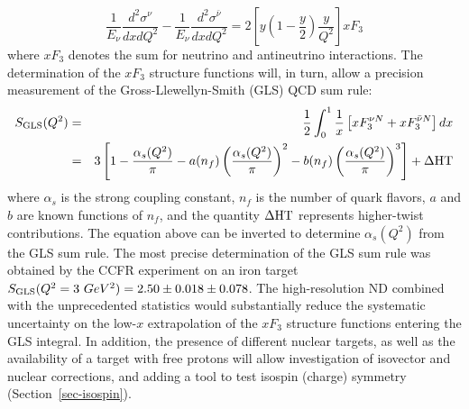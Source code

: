 \begin{equation} 
\frac{1}{E_\nu} \frac{d^2 \sigma^\nu}{dx dQ^2} - \frac{1}{E_\nu} \frac{d^2 \sigma^{\bar \nu}}{dx dQ^2} = 2 \left[ y \left( 1 - \frac{y}{2} \right) \frac{y}{Q^2} \right] xF_3  
\end{equation} where $xF_3$ denotes the sum for neutrino and antineutrino interactions. 
The determination of the $xF_3$ structure functions will, in turn,
allow a precision measurement of the Gross-Llewellyn-Smith (GLS) QCD
sum rule:
\begin{eqnarray}
\label{eq:GLS}
S_{\rm GLS} (Q^2) & = & 
\frac{1}{2} \int^1_0 \frac{1}{x} \left[ xF_3^{\nu N} + xF_3^{\bar \nu N} \right] dx \nonumber \\ 
& = & 3 \left[ 1 - \frac{\alpha_s(Q^2)}{\pi} - a(n_f) \left( \frac{\alpha_s(Q^2)}{\pi} \right)^2
-b(n_f) \left( \frac{\alpha_s(Q^2)}{\pi} \right)^3 \right] + \Delta {\rm HT}
\end{eqnarray}
where $\alpha_s$ is the strong coupling constant, $n_f$ is the number
of quark flavors, $a$ and $b$ are known functions of $n_f$, and the
quantity $\Delta {\rm HT}$ represents higher-twist contributions.  The
equation above can be inverted to determine $\alpha_s(Q^2)$ from the
GLS sum rule. The most precise determination of the GLS sum rule was
obtained by the CCFR experiment on an iron target~\cite{Leung:1992yx}
$S_{\rm GLS} (Q^2=3~GeV^2) = 2.50 \pm 0.018 \pm 0.078$. %
The high-resolution ND combined with the unprecedented statistics
would substantially reduce the systematic uncertainty on the low-$x$
extrapolation of the $xF_3$ structure functions entering the GLS
integral.  In addition, the presence of different nuclear targets, as
well as the availability of a target with free protons
will allow investigation of isovector and nuclear corrections, and
adding a tool to test isospin (charge) symmetry (Section~\ref{sec-isospin}).
